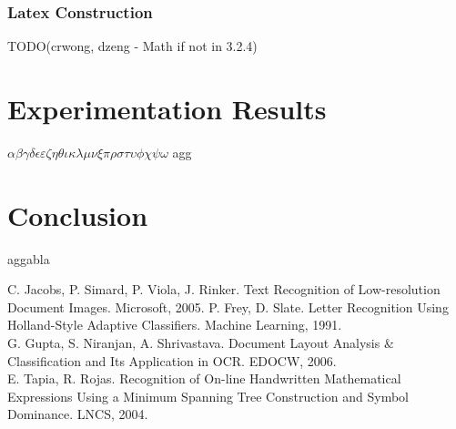 \documentclass[12pt]{IEEEtran}
\begin{document}
\subsubsection{Latex Construction}

TODO(crwong, dzeng - Math if not in 3.2.4)

\section{Experimentation Results}

$\alpha\beta\gamma\delta\epsilon\varepsilon\zeta\eta\theta\iota\kappa\lambda\mu\nu\xi\pi\rho\sigma\tau\upsilon\phi\chi\psi\omega$
agg

\section{Conclusion}

aggabla

\begin{thebibliography}{1}
 C. Jacobs, P. Simard, P. Viola, J. Rinker. Text Recognition of Low-resolution Document Images. Microsoft, 2005.
 P. Frey, D. Slate. Letter Recognition Using Holland-Style
Adaptive Classifiers. Machine Learning, 1991. \\
 G. Gupta, S. Niranjan, A. Shrivastava. Document Layout Analysis \& Classification and Its Application in OCR. EDOCW, 2006. \\
 E. Tapia, R. Rojas. Recognition of On-line Handwritten Mathematical Expressions Using a Minimum Spanning Tree Construction and Symbol Dominance. LNCS, 2004.
\end{thebibliography}

\end{document}
